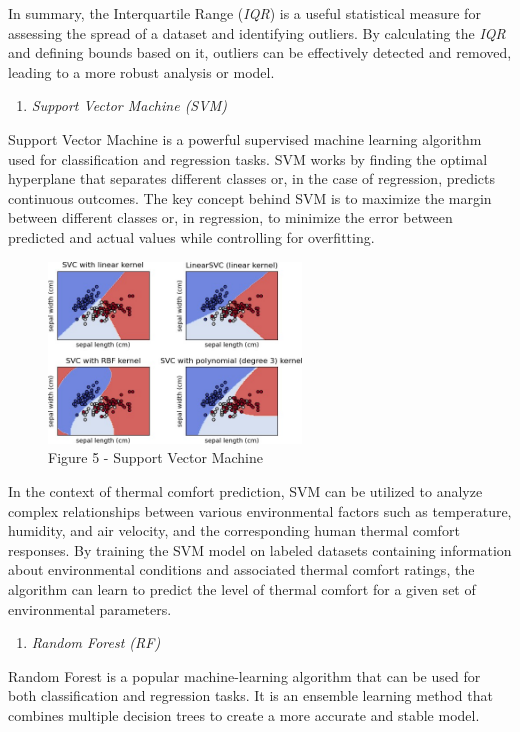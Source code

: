 \begin{multicols}{2}
In summary, the Interquartile Range (\emph{IQR}) is a useful statistical
measure for assessing the spread of a dataset and identifying outliers.
By calculating the \emph{IQR} and defining bounds based on it, outliers
can be effectively detected and removed, leading to a more robust
analysis or model.

\begin{enumerate}[leftmargin=*]
\def\labelenumi{\Alph{enumi}.}
\setcounter{enumi}{5}
\item
  \emph{Support Vector Machine (SVM)}
\end{enumerate}

Support Vector Machine is a powerful supervised machine learning
algorithm used for classification and regression tasks. SVM works by
finding the optimal hyperplane that separates different classes or, in
the case of regression, predicts continuous outcomes. The key concept
behind SVM is to maximize the margin between different classes or, in
regression, to minimize the error between predicted and actual values
while controlling for overfitting.
\end{multicols}

\begin{figure}[H]
	\centering
	\includegraphics[width=0.6\textwidth]{media/ict/image21}
	\caption*{Figure 5 - Support Vector Machine}
\end{figure}

\begin{multicols}{2}
In the context of thermal comfort prediction, SVM can be utilized to
analyze complex relationships between various environmental factors such
as temperature, humidity, and air velocity, and the corresponding human
thermal comfort responses. By training the SVM model on labeled datasets
containing information about environmental conditions and associated
thermal comfort ratings, the algorithm can learn to predict the level of
thermal comfort for a given set of environmental parameters.

\begin{enumerate}[leftmargin=*]
\def\labelenumi{\Alph{enumi}.}
\setcounter{enumi}{6}
\item
  \emph{Random Forest (RF)}
\end{enumerate}

Random Forest is a popular machine-learning algorithm that can be used
for both classification and regression tasks. It is an ensemble learning
method that combines multiple decision trees to create a more accurate
and stable model.
\end{multicols}

